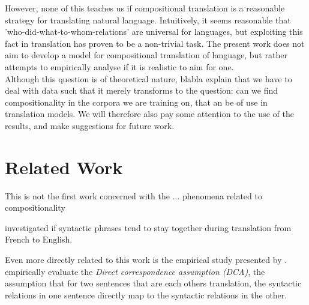 \documentclass{report}
\theoremstyle{definition}
\theoremstyle{plain}
\begin{document}

However, none of this teaches us if compositional translation is a reasonable strategy for translating natural language. Intuitively, it seems reasonable that 'who-did-what-to-whom-relations' are universal for languages, but exploiting this fact in translation has proven to be a non-trivial task. The present work does not aim to develop a model for compositional translation of language, but rather attempts to empirically analyse if it is realistic to aim for one.\\
Although this question is of theoretical nature, blabla explain that we have to deal with data such that it merely transforms to the question: can we find compositionality in the corpora we are training on, that an be of use in translation models. We will therefore also pay some attention to the use of the results, and make suggestions for future work.

\section*{Related Work}

This is not the first work concerned with the ... phenomena related to compositionality

\cite{fox2002phrasal} investigated if syntactic phrases tend to stay together during translation from French to English.

Even more directly related to this work is the empirical study presented by \cite{hwa2002evaluating}. \citeauthor{hwa2002evaluating} empirically evaluate the \textit{Direct correspondence assumption (DCA)}, the assumption that for two sentences that are each others translation, the syntactic relations in one sentence directly map to the syntactic relations in the other. %
\end{document}
